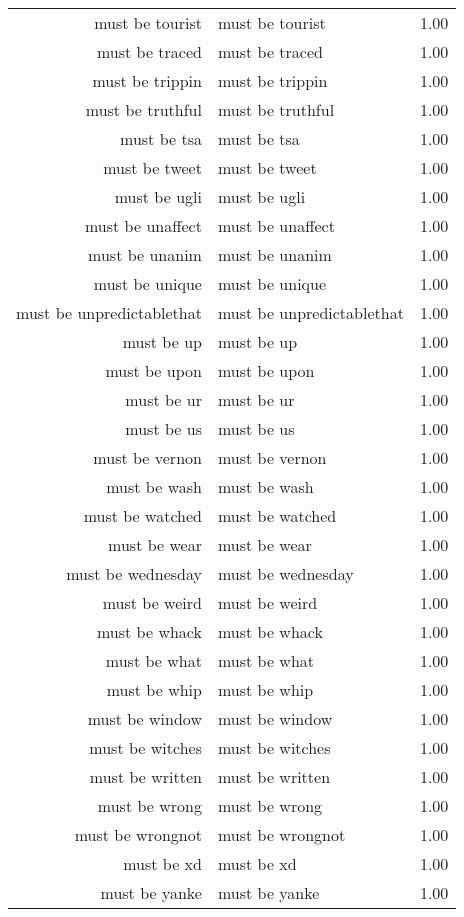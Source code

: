 \begin{table}[ht]
\begin{tabular}{rlr}
  must be tourist & must be tourist & 1.00 \\ 
  must be traced & must be traced & 1.00 \\ 
  must be trippin & must be trippin & 1.00 \\ 
  must be truthful & must be truthful & 1.00 \\ 
  must be tsa & must be tsa & 1.00 \\ 
  must be tweet & must be tweet & 1.00 \\ 
  must be ugli & must be ugli & 1.00 \\ 
  must be unaffect & must be unaffect & 1.00 \\ 
  must be unanim & must be unanim & 1.00 \\ 
  must be unique & must be unique & 1.00 \\ 
  must be unpredictablethat & must be unpredictablethat & 1.00 \\ 
  must be up & must be up & 1.00 \\ 
  must be upon & must be upon & 1.00 \\ 
  must be ur & must be ur & 1.00 \\ 
  must be us & must be us & 1.00 \\ 
  must be vernon & must be vernon & 1.00 \\ 
  must be wash & must be wash & 1.00 \\ 
  must be watched & must be watched & 1.00 \\ 
  must be wear & must be wear & 1.00 \\ 
  must be wednesday & must be wednesday & 1.00 \\ 
  must be weird & must be weird & 1.00 \\ 
  must be whack & must be whack & 1.00 \\ 
  must be what & must be what & 1.00 \\ 
  must be whip & must be whip & 1.00 \\ 
  must be window & must be window & 1.00 \\ 
  must be witches & must be witches & 1.00 \\ 
  must be written & must be written & 1.00 \\ 
  must be wrong & must be wrong & 1.00 \\ 
  must be wrongnot & must be wrongnot & 1.00 \\ 
  must be xd & must be xd & 1.00 \\ 
  must be yanke & must be yanke & 1.00 \\ 

\end{tabular}
\end{table}
